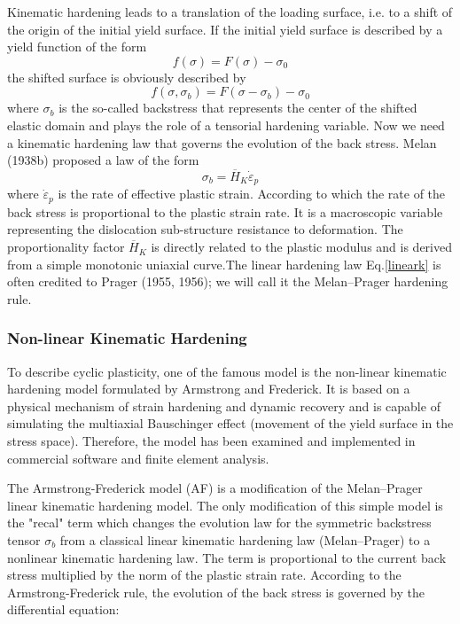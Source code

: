 \documentclass[3p,times,procedia,number]{elsarticle}
\begin{document}
Kinematic hardening leads to a translation of the loading surface, i.e. to a shift of
the origin of the initial yield surface. If the initial yield surface is described by a yield
function of the form
$$f(\sigma) = F(\sigma) -\sigma_0 $$
the shifted surface is obviously described by
$$f(\sigma,\sigma_b ) = F(\sigma-\sigma_b ) -\sigma_0$$
where $\sigma_b$ is the so-called backstress that represents the center of the shifted elastic
domain and plays the role of a tensorial hardening variable. Now we need a kinematic
hardening law that governs the evolution of the back stress. Melan (1938b) proposed
a law of the form
\begin{equation}
\sigma_b =\overline{H}_K \dot{\varepsilon}_p
\label{lineark}
\end{equation}
where $ \dot{\varepsilon}_p$ is the rate of effective plastic strain. According to which the rate of the back stress is proportional to the plastic strain rate. It is a macroscopic variable representing the
dislocation sub-structure resistance to deformation. 
The proportionality factor $\overline{H}_K$ is directly related to the plastic modulus and is derived from a simple
monotonic uniaxial curve.The linear hardening law Eq.\eqref{lineark} is often credited to Prager (1955, 1956); we will call it the Melan–Prager hardening rule. 

\subsubsection{Non-linear Kinematic Hardening}
To describe cyclic plasticity, one of the famous model is the non-linear kinematic hardening model formulated by Armstrong and Frederick. It is based on a physical mechanism of strain hardening and dynamic recovery and is capable of simulating the
multiaxial Bauschinger effect (movement of the yield surface in the stress space). Therefore, the model has been examined and implemented in commercial software and finite element analysis.

The Armstrong-Frederick model (AF) is a modification of the Melan–Prager linear kinematic hardening model. The only modification of this simple model is the "recal" term which changes the evolution law for the symmetric backstress tensor $\sigma_b$ from a classical linear kinematic hardening law (Melan–Prager) to a nonlinear kinematic hardening law. The term is proportional to the current back stress multiplied by the norm of the plastic strain rate. According to the Armstrong-Frederick rule, the evolution of the
back stress is governed by the differential equation:
\end{document}
